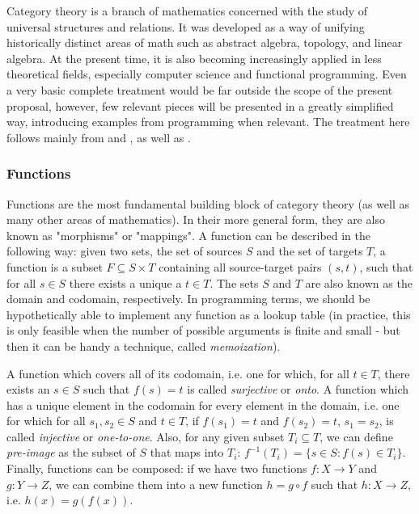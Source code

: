 \documentclass[12pt,a4paper]{article}
\begin{document}
Category theory is a branch of mathematics concerned with the study of universal structures and relations. It was developed as a way of unifying historically distinct areas of math such as abstract algebra, topology, and linear algebra. At the present time, it is also becoming increasingly applied in less theoretical fields, especially computer science and functional programming. Even a very basic complete treatment would be far outside the scope of the present proposal, however, few relevant pieces will be presented in a greatly simplified way, introducing examples from programming when relevant. The treatment here follows mainly from \cite{fong2019} and \cite{Milewski2018}, as well as \cite{leinster2014}.

\subsubsection{Functions}
\label{sec:functions}

Functions are the most fundamental building block of category theory (as well as many other areas of mathematics). In their more general form, they are also known as "morphisms" or "mappings". A function can be described in the following way: given two sets, the set of sources $S$ and the set of targets $T$, a function is a subset $F \subseteq S \times T$ containing all source-target pairs $(s, t)$, such that for all $s \in S$ there exists a unique a $t \in T$. The sets $S$ and $T$ are also known as the domain and codomain, respectively. In programming terms, we should be hypothetically able to implement any function as a lookup table (in practice, this is only feasible when the number of possible arguments is finite and small - but then it can be handy a technique, called \textit{memoization}).  

A function which covers all of its codomain, i.e. one for which, for all $t \in T$, there exists an $s \in S$ such that $f(s) = t$ is called \textit{surjective} or \textit{onto}. A function which has a unique element in the codomain for every element in the domain, i.e. one for which for all $s_1, s_2 \in S$ and $t \in T$, if $f(s_1) = t$ and $f(s_2) = t$, $s_1 = s_2$, is called \textit{injective} or \textit{one-to-one}. Also, for any given subset $T_i \subseteq T$, we can define \textit{pre-image} as the subset of $S$ that maps into $T_i$: $f^{-1}(T_i) = \{ s \in S : f(s) \in T_i \}$. Finally, functions can be composed: if we have two functions $f: X \to Y$ and $g: Y \to Z$, we can combine them into a new function $h = g \circ f$ such that $h: X \to Z$, i.e. $h(x) = g(f(x))$. 
\end{document}

